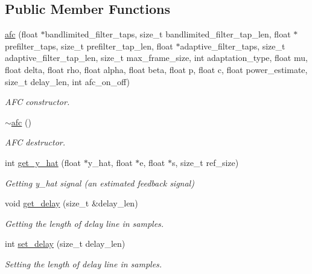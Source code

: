 \subsection*{Public Member Functions}
\begin{DoxyCompactItemize}
\item 
\hyperlink{classafc_a2f6b513c6bbc373ee59b1dddcb71f6a4}{afc} (float $\ast$bandlimited\+\_\+filter\+\_\+taps, size\+\_\+t bandlimited\+\_\+filter\+\_\+tap\+\_\+len, float $\ast$prefilter\+\_\+taps, size\+\_\+t prefilter\+\_\+tap\+\_\+len, float $\ast$adaptive\+\_\+filter\+\_\+taps, size\+\_\+t adaptive\+\_\+filter\+\_\+tap\+\_\+len, size\+\_\+t max\+\_\+frame\+\_\+size, int adaptation\+\_\+type, float mu, float delta, float rho, float alpha, float beta, float p, float c, float power\+\_\+estimate, size\+\_\+t delay\+\_\+len, int afc\+\_\+on\+\_\+off)
\begin{DoxyCompactList}\small\item\em A\+FC constructor. \end{DoxyCompactList}\item 
\mbox{\label{classafc_a9143ec3fdf33d512a307c98e977f5e5a}} 
\hyperlink{classafc_a9143ec3fdf33d512a307c98e977f5e5a}{$\sim$afc} ()
\begin{DoxyCompactList}\small\item\em A\+FC destructor. \end{DoxyCompactList}\item 
int \hyperlink{classafc_ad4678623a91bce48b23dd2bdfd403682}{get\+\_\+y\+\_\+hat} (float $\ast$y\+\_\+hat, float $\ast$e, float $\ast$s, size\+\_\+t ref\+\_\+size)
\begin{DoxyCompactList}\small\item\em Getting y\+\_\+hat signal (an estimated feedback signal) \end{DoxyCompactList}\item 
void \hyperlink{classafc_abe939a99bca35b708ffd66bef80abeb4}{get\+\_\+delay} (size\+\_\+t \&delay\+\_\+len)
\begin{DoxyCompactList}\small\item\em Getting the length of delay line in samples. \end{DoxyCompactList}\item 
int \hyperlink{classafc_adf8c29b6bfc26a0d91eccdff26c76887}{set\+\_\+delay} (size\+\_\+t delay\+\_\+len)
\begin{DoxyCompactList}\small\item\em Setting the length of delay line in samples. \end{DoxyCompactList}\item 

\end{DoxyCompactItemize}
